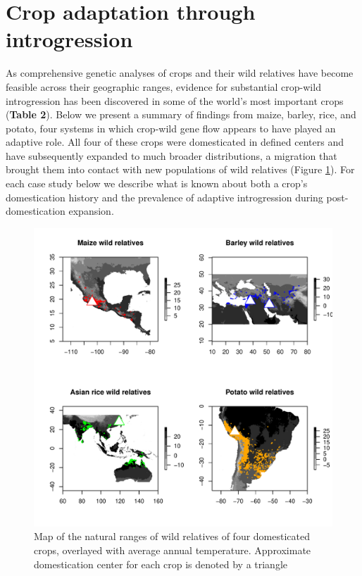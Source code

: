 \documentclass[11pt]{article}
\begin{document}
\section*{Crop adaptation through introgression}

As comprehensive genetic analyses of crops and their wild relatives have become feasible across their geographic ranges, evidence for substantial crop-wild introgression has been discovered in some of the world's most important crops (\textbf{Table 2}).
Below we present a summary of findings from maize, barley, rice, and potato, four systems in which crop-wild gene flow appears to have played an adaptive role.
All four of these crops were domesticated in defined centers and have subsequently expanded to much broader distributions, a migration that brought them into contact with new populations of wild relatives (Figure \ref{fig:map}).
For each case study below we describe what is known about both a crop's domestication history and the prevalence of adaptive introgression during post-domestication  expansion.

\begin{figure}[h]
	\centering
	\includegraphics[width=15cm]{temperature_plot_degC.pdf}
	\caption{Map of the natural ranges of wild relatives of four domesticated crops, overlayed with average annual temperature. Approximate domestication center for each crop is denoted by a triangle}
	\label{fig:map}
\end{figure}
\end{document}

